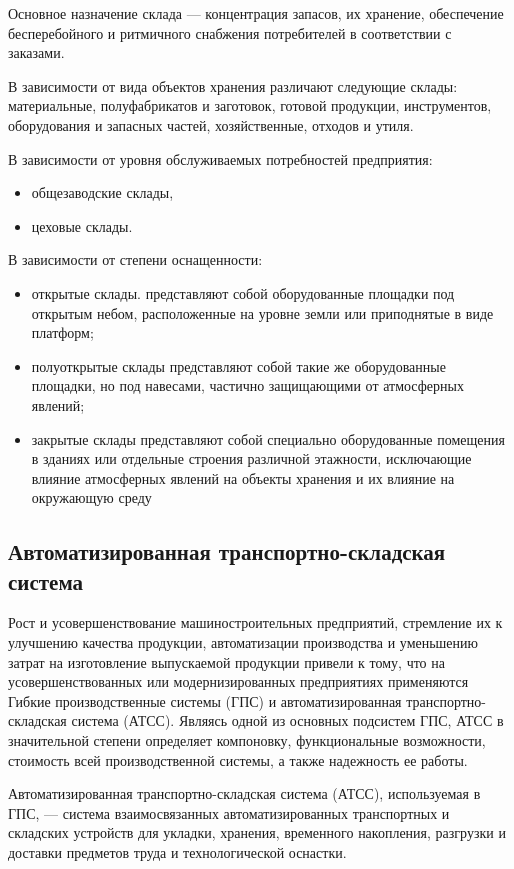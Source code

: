 Основное назначение склада --- концентрация запасов, их хранение, обеспечение бесперебойного и ритмичного снабжения потребителей в соответствии с заказами.

В зависимости от вида объектов хранения различают следующие склады: материальные, полуфабрикатов и заготовок, готовой продукции, инструментов, оборудования и запасных частей, хозяйственные, отходов и утиля.

В зависимости от уровня обслуживаемых потребностей предприятия:

\begin{itemize}
    \item общезаводские склады,
    \item цеховые склады.
\end{itemize}

В зависимости от степени оснащенности:

\begin{itemize}
    \item открытые склады. представляют собой оборудованные площадки под открытым небом, расположенные на уровне земли или приподнятые в виде платформ;
    \item полуоткрытые склады представляют собой такие же оборудованные площадки, но под навесами, частично защищающими от атмосферных явлений;
    \item закрытые склады представляют собой специально оборудованные помещения в зданиях или отдельные строения различной этажности, исключающие влияние атмосферных явлений на объекты хранения и их влияние на окружающую среду
\end{itemize}

\subsection{Автоматизированная транспортно-складская система}

Рост и усовершенствование машиностроительных предприятий, стремление их к улучшению качества продукции, автоматизации производства и уменьшению затрат на изготовление выпускаемой продукции привели к тому, что на усовершенствованных или модернизированных предприятиях применяются Гибкие производственные системы (ГПС) и автоматизированная транспортно-складская система (АТСС). Являясь одной из основных подсистем ГПС, АТСС в значительной степени определяет компоновку, функциональные возможности, стоимость всей производственной системы, а также надежность ее работы.

Автоматизированная транспортно-складская система (АТСС), используемая в ГПС, --- система взаимосвязанных автоматизированных транспортных и складских устройств для укладки, хранения, временного накопления, разгрузки и доставки предметов труда и технологической оснастки.


